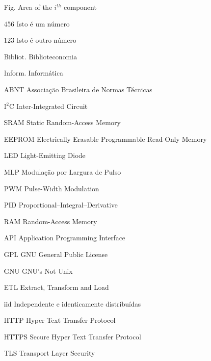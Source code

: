 \begin{siglas}
	\item[Fig.] Area of the $i^{th}$ component
	\item[456] Isto é um número
	\item[123] Isto é outro número
	\item [Bibliot.] Biblioteconomia
	\item [Inform.]  Informática
	\item [ABNT] Associação Brasileira de Normas Técnicas
	\item [I$^2$C] Inter-Integrated Circuit
	\item [SRAM] Static Random-Access Memory
	\item [EEPROM]  Electrically Erasable Programmable Read-Only Memory
	\item [LED] Light-Emitting Diode
	\item [MLP] Modulação por Largura de Pulso
	\item [PWM] Pulse-Width Modulation
	\item [PID] Proportional–Integral–Derivative
	\item [RAM] Random-Access Memory
	\item [API] Application Programming Interface
	\item [GPL] GNU General Public License
	\item [GNU] GNU's Not Unix
	\item [ETL] Extract, Transform and Load
	\item [iid] Independente e identicamente distribuídas
	\item [HTTP] Hyper Text Transfer Protocol
	\item [HTTPS] Secure Hyper Text Transfer Protocol
	\item [TLS] Transport Layer Security
\end{siglas}